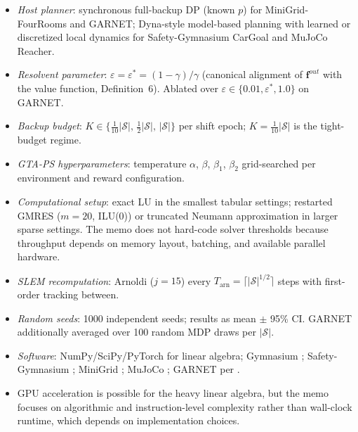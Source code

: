 \documentclass[10pt,a4paper]{article}
\begin{document}
\begin{itemize}\setlength\itemsep{1pt}
  \item \textit{Host planner}: synchronous full-backup DP (known $p$) for MiniGrid-FourRooms and GARNET;
    Dyna-style model-based planning with learned or discretized local dynamics for Safety-Gymnasium CarGoal and MuJoCo Reacher.
  \item \textit{Resolvent parameter}: $\varepsilon = \varepsilon^* = (1-\gamma)/\gamma$
    (canonical alignment of $\mathbf{f}^{out}$ with the value function, Definition~6).
    Ablated over $\varepsilon \in \{0.01, \varepsilon^*, 1.0\}$ on GARNET.
  \item \textit{Backup budget}: $K \in \{\frac{1}{10}|\mathcal{S}|,\, \frac{1}{2}|\mathcal{S}|,\, |\mathcal{S}|\}$
    per shift epoch; $K = \frac{1}{10}|\mathcal{S}|$ is the tight-budget regime.
  \item \textit{GTA-PS hyperparameters}: temperature $\alpha$, $\beta$, $\beta_1$, $\beta_2$ grid-searched per environment and reward configuration.
  \item \textit{Computational setup}: exact LU in the smallest tabular settings; restarted GMRES
    ($m = 20$, ILU(0)) or truncated Neumann approximation in larger sparse settings.
    The memo does not hard-code solver thresholds because throughput depends on memory layout,
    batching, and available parallel hardware.
  \item \textit{SLEM recomputation}: Arnoldi ($j = 15$) every
    $T_{\mathrm{arn}} = \lceil|\mathcal{S}|^{1/2}\rceil$ steps with first-order tracking between.
  \item \textit{Random seeds}: 1000 independent seeds; results as mean $\pm$ 95\% CI.
    GARNET additionally averaged over 100 random MDP draws per $|\mathcal{S}|$.
  \item \textit{Software}: NumPy/SciPy/PyTorch for linear algebra;
    Gymnasium \citep{towers2024gymnasium};
    Safety-Gymnasium \citep{ji2023safetygymnasium};
    MiniGrid \citep{chevalier2023minigrid};
    MuJoCo \citep{todorov2012mujoco};
    GARNET per \citet{archibald1995generation}.
  \item GPU acceleration is possible for the heavy linear algebra, but the memo focuses on algorithmic
  and instruction-level complexity rather than wall-clock runtime, which depends on implementation choices.
\end{itemize}
\end{document}
